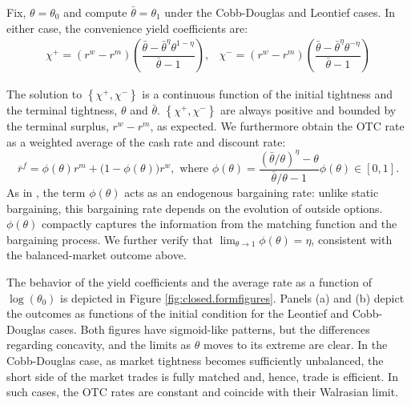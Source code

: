 \documentclass[12pt,american,english,notitlepage]{article}
\begin{document}
\begin{proposition}
    
\label{prop:analytic.solution-2} Fix, $\theta=\theta_{0}$
and compute $\bar{\ensuremath{\theta}}=\theta_{1}$ under the Cobb-Douglas
and Leontief cases. In either case, the convenience yield coefficients are:{
\[
\begin{array}{ll}
\chi^{+} = \left(r^{w}-r^{m}\right)\left(\dfrac{\bar{\theta}-\bar{\theta}^{\eta}\theta^{1-\eta}}{\bar{\theta}-1}\right), &
\chi^{-} = \left(r^{w}-r^{m}\right)\left(\dfrac{\bar{\theta}-\bar{\theta}^{\eta}\theta^{-\eta}}{\bar{\theta}-1}\right)
\end{array}
\]
}
\end{proposition}
The solution to $\left\{ \chi^{+},\chi^{-}\right\} $
is a continuous function of the initial tightness and the terminal
tightness, $\theta$ and $\bar{\theta}$. $\left\{ \chi^{+},\chi^{-}\right\} $
are always positive and bounded by the terminal surplus, $r^{w}-r^{m}$,
as expected. We furthermore obtain the OTC rate as
a weighted average of the cash rate and discount rate:
\begin{equation}
\overline{r}^{f}=\phi\left(\theta\right)r^{m}+(1-\phi\left(\theta\right)\mathbf{)}r^{w},\text{ where }\phi\left(\theta\right)=\frac{\left(\bar{\theta}/\theta\right)^{\eta}-\theta}{\bar{\theta}/\theta-1}\phi\left(\theta\right)\in\left[0,1\right].\label{eq:OTC.rate}
\end{equation}
As in \cite{AL15-ECMA}, the term $\phi\left(\theta\right)$ acts as an endogenous bargaining
rate: unlike static bargaining, this bargaining rate depends on the
evolution of outside options. {$\phi\left(\theta\right)$}
compactly captures the information from the matching function and
the bargaining process. We further verify that $\lim_{\theta\rightarrow1}\phi\left(\theta\right)=\eta$,
consistent with the balanced-market outcome above. 

The behavior of the yield coefficients and the average rate as a function
of $\log\left(\theta_{0}\right)$ is depicted in Figure \ref{fig:closed.formfigures}.
Panels (a) and (b) depict the outcomes as functions of the initial
condition for the Leontief and Cobb-Douglas cases. Both figures have
sigmoid-like patterns, but the differences regarding concavity, and
the limits as $\theta$ moves to its extreme are clear. In the Cobb-Douglas case, as market tightness becomes sufficiently unbalanced, the short side of the market trades is fully matched and, hence, trade is efficient. In such cases, the OTC rates are constant and coincide with their Walrasian limit.
\end{document}
